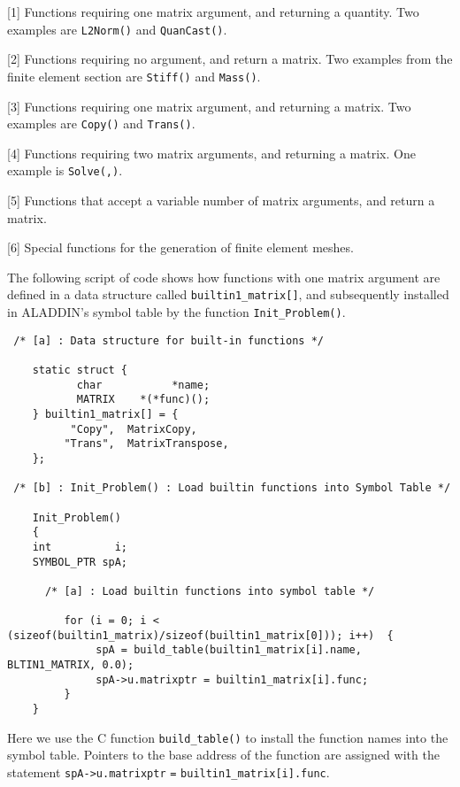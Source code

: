 \begin{description}
\item{[1]}
Functions requiring one matrix argument, and returning a quantity.
Two examples are {\tt L2Norm()} and {\tt QuanCast()}. 
\item{[2]}
Functions requiring no argument, and return a matrix.
Two examples from the finite element section are {\tt Stiff()} and {\tt Mass()}. 
\item{[3]}
Functions requiring one matrix argument, and returning a matrix.
Two examples are {\tt Copy()} and {\tt Trans()}.
\item{[4]}
Functions requiring two matrix arguments, and returning a matrix.
One example is {\tt Solve(,)}.
\item{[5]}
Functions that accept a variable number of matrix arguments, and return a matrix.
\item{[6]}
Special functions for the generation of finite element meshes.
\end{description}

\vspace{0.10 in}\noindent
The following script of code shows how functions with
one matrix argument are defined in a data
structure called {\tt builtin1\_matrix[]},
and subsequently installed in ALADDIN's symbol table by
the function {\tt Init\_Problem()}.

\begin{footnotesize}
\begin{verbatim}
 /* [a] : Data structure for built-in functions */

    static struct {
           char           *name;
           MATRIX    *(*func)();
    } builtin1_matrix[] = {
          "Copy",  MatrixCopy,
         "Trans",  MatrixTranspose,
    };

 /* [b] : Init_Problem() : Load builtin functions into Symbol Table */

    Init_Problem()
    {
    int          i;
    SYMBOL_PTR spA;

      /* [a] : Load builtin functions into symbol table */

         for (i = 0; i < (sizeof(builtin1_matrix)/sizeof(builtin1_matrix[0])); i++)  {
              spA = build_table(builtin1_matrix[i].name, BLTIN1_MATRIX, 0.0);
              spA->u.matrixptr = builtin1_matrix[i].func;
         }
    }
\end{verbatim}
\end{footnotesize}

\vspace{0.15 in}\noindent
Here we use the C function {\tt build\_table()} to install the function
names into the symbol table. Pointers to the base address of
the function are assigned with the statement {\tt spA->u.matrixptr} {\tt =}
{\tt builtin1\_matrix[i].func}.

